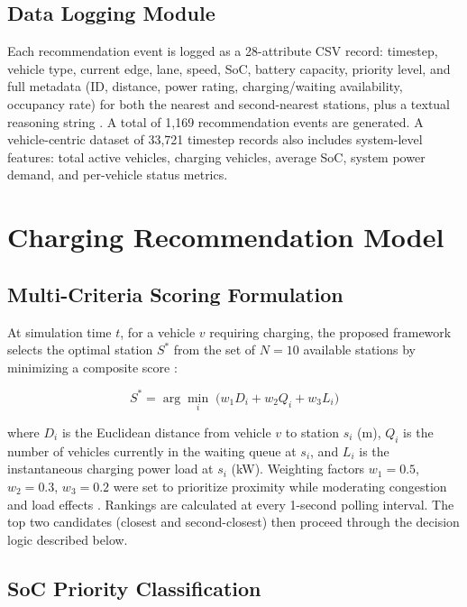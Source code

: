 \documentclass[conference]{IEEEtran}
\begin{document}
\subsection{Data Logging Module}

Each recommendation event is logged as a 28-attribute CSV record: timestep, vehicle type, current edge, lane, speed, SoC, battery capacity, priority level, and full metadata (ID, distance, power rating, charging/waiting availability, occupancy rate) for both the nearest and second-nearest stations, plus a textual reasoning string \cite{b8}. A total of 1,169 recommendation events are generated. A vehicle-centric dataset of 33,721 timestep records also includes system-level features: total active vehicles, charging vehicles, average SoC, system power demand, and per-vehicle status metrics.

\section{Charging Recommendation Model}

\subsection{Multi-Criteria Scoring Formulation}

At simulation time $t$, for a vehicle $v$ requiring charging, the proposed framework selects the optimal station $S^*$ from the set of $N=10$ available stations by minimizing a composite score \cite{b5, b6}:

\begin{equation}
S^* = \arg\min_{i} \; \bigl(w_1 D_i + w_2 Q_i + w_3 L_i\bigr)
\label{eq:score}
\end{equation}

where $D_i$ is the Euclidean distance from vehicle $v$ to station $s_i$ (m), $Q_i$ is the number of vehicles currently in the waiting queue at $s_i$, and $L_i$ is the instantaneous charging power load at $s_i$ (kW). Weighting factors $w_1 = 0.5$, $w_2 = 0.3$, $w_3 = 0.2$ were set to prioritize proximity while moderating congestion and load effects \cite{b18}. Rankings are calculated at every 1-second polling interval. The top two candidates (closest and second-closest) then proceed through the decision logic described below.

\subsection{SoC Priority Classification}
\end{document}

